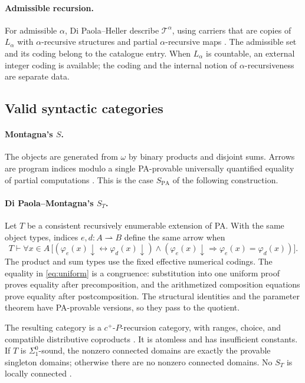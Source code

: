\documentclass[11pt]{article}
\theoremstyle{definition}
\newcommand{\N}{\omega}
\begin{document}
\paragraph{Admissible recursion.}
For admissible $\alpha$, Di Paola--Heller describe
$\mathcal T^\alpha$, using carriers that are copies of $L_\alpha$
with $\alpha$-recursive structures and partial
$\alpha$-recursive maps \cite[\S4.6, Example 7, p.~608]{DPH}.
The admissible set and its coding belong to the catalogue entry.
When $L_\alpha$ is countable, an external integer coding is available;
the coding and the internal notion of $\alpha$-recursiveness are
separate data.

\subsection{Valid syntactic categories}

\paragraph{Montagna's $S$.}
The objects are generated from $\N$ by binary products and disjoint
sums. Arrows are program indices modulo a single PA-provable universally
quantified equality of partial computations
\cite[pp.~105--108]{Montagna}. This is the case $S_{\mathrm{PA}}$
of the following construction.

\paragraph{Di Paola--Montagna's $S_T$.}
Let $T$ be a consistent recursively enumerable extension of PA. With
the same object types, indices $e,d:A\rightharpoonup B$ define the
same arrow when
\begin{equation}\label{eq:uniform}
 T\vdash\forall x\in A\,
 \bigl[(\varphi_e(x)\downarrow\leftrightarrow\varphi_d(x)\downarrow)
 \land(\varphi_e(x)\downarrow\Rightarrow
                \varphi_e(x)=\varphi_d(x))\bigr].
\end{equation}
The product and sum types use the fixed effective numerical codings.
The equality in \eqref{eq:uniform} is a congruence: substitution into
one uniform proof proves equality after precomposition, and the
arithmetized composition equations prove equality after postcomposition.
The structural identities and the parameter theorem have PA-provable
versions, so they pass to the quotient.

The resulting category is a $c^+$-$P$-recursion category, with ranges,
choice, and compatible distributive coproducts
\cite[\S2, p.~646]{DPM}. It is atomless and has insufficient constants.
If $T$ is $\Sigma^0_1$-sound, the nonzero connected domains are
exactly the provable singleton domains; otherwise there are no nonzero
connected domains. No $S_T$ is locally connected
\cite[Theorem 4.3 and Corollary 4.4, pp.~657--658]{DPM}.
\end{document}
